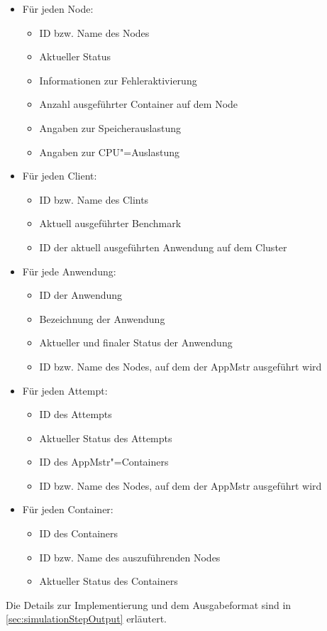 \begin{itemize}
    \item Für jeden Node:
    \begin{itemize}
        \item ID bzw. Name des Nodes
        \item Aktueller Status
        \item Informationen zur Fehleraktivierung
        \item Anzahl ausgeführter Container auf dem Node
        \item Angaben zur Speicherauslastung
        \item Angaben zur CPU"=Auslastung
    \end{itemize}
    
    \item Für jeden Client:
    \begin{itemize}
        \item ID bzw. Name des Clints
        \item Aktuell ausgeführter Benchmark
        \item ID der aktuell ausgeführten Anwendung auf dem Cluster
    \end{itemize}

    \item Für jede Anwendung:
    \begin{itemize}
        \item ID der Anwendung
        \item Bezeichnung der Anwendung
        \item Aktueller und finaler Status der Anwendung
        \item ID bzw. Name des Nodes, auf dem der \ac{AppMstr} ausgeführt wird
    \end{itemize}

    \item Für jeden Attempt:
    \begin{itemize}
        \item ID des Attempts
        \item Aktueller Status des Attempts
        \item ID des \ac{AppMstr}"=Containers
        \item ID bzw. Name des Nodes, auf dem der \ac{AppMstr} ausgeführt wird
    \end{itemize}

    \item Für jeden Container:
    \begin{itemize}
        \item ID des Containers
        \item ID bzw. Name des auszuführenden Nodes
        \item Aktueller Status des Containers
    \end{itemize}
\end{itemize}

Die Details zur Implementierung und dem Ausgabeformat sind in \autoref{sec:simulationStepOutput} erläutert.
